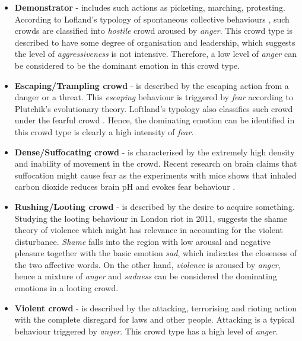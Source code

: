 \begin{itemize}
\item \textbf{Demonstrator} - includes such actions as picketing, marching, protesting. According to Lofland's typology of spontaneous collective behaviours \citep{Kornblum2011}, such crowds are classified into \textit{hostile} crowd aroused by \textit{anger}. This crowd type is described to have some degree of organisation and leadership, which suggests the level of \textit{aggressiveness} is not intensive. Therefore, a low level of \textit{anger} can be considered to be the dominant emotion in this crowd type.
\item \textbf{Escaping/Trampling crowd} - is described by the escaping action from a danger or a threat. This \textit{escaping} behaviour is triggered by \textit{fear} according to Plutchik's evolutionary theory. Loftland's typology also classifies such crowd under the fearful crowd \cite{Kornblum2011}. Hence, the dominating emotion can be identified in this crowd type is clearly a high intensity of \textit{fear}.
\item \textbf{Dense/Suffocating crowd} - is characterised by the extremely high density and inability of movement in the crowd. Recent research on brain claims that suffocation might cause fear as the experiments with mice shows that inhaled carbon dioxide reduces brain pH and evokes fear behaviour \citep{ziemann2009amygdala}.
\item \textbf{Rushing/Looting crowd} - is described by the desire to acquire something. Studying the looting behaviour in London riot in 2011, \citet{ray2014shame} suggests the shame theory of violence which might has relevance in accounting for the violent disturbance. \textit{Shame} falls into the region with low arousal and negative pleasure together with the basic emotion \textit{sad}, which indicates the closeness of the two affective words. On the other hand, \textit{violence} is aroused by \textit{anger}, hence a mixture of \textit{anger} and \textit{sadness} can be considered the dominating emotions in a looting crowd.
\item \textbf{Violent crowd} - is described by the attacking, terrorising and rioting action with the complete disregard for laws and other people. Attacking is a typical behaviour triggered by \textit{anger}. This crowd type has a high level of \textit{anger}.
\end{itemize}

